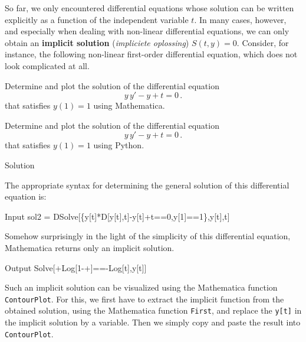 So far, we only encountered differential equations whose solution can be written explicitly as a function of the independent variable $t$. In many cases, however, and especially when dealing with non-linear differential equations, we can only obtain an \textbf{implicit solution} (\textit{impliciete oplossing}) $S(t,y)=0$. Consider, for instance, the following  non-linear first-order differential equation, which does not look complicated at all.  


\begin{example}
\ifmathematica
Determine and plot the solution of the differential equation
$$
y\,y' - y + t = 0\,. 
$$
that satisfies $y(1)=1$ using Mathematica.\fi

\ifpython
Determine and plot the solution of the differential equation
$$
y\,y' - y + t = 0\,. 
$$
that satisfies $y(1)=1$ using Python.
\fi

\pagebreak
{}Solution 

\ifmathematica
The appropriate syntax for determining the general solution of this differential equation is: 
\begin{mdframed}[default,backgroundcolor=gray!40,roundcorner=8pt]
\begin{mmaCell}{Input}
  sol2 = DSolve[\{y[t]*D[y[t],t]-y[t]+t==0,y[1]==1\},y[t],t]
\end{mmaCell}
\end{mdframed}

Somehow surprisingly in the light of the simplicity of this differential equation, Mathematica returns only an implicit solution. 

\begin{mdframed}[default,backgroundcolor=gray!40,roundcorner=8pt]
\begin{mmaCell}{Output}
  Solve[+Log[1-+]==-Log[t],y[t]]
\end{mmaCell}
\end{mdframed}

Such an implicit solution can be visualized using the Mathematica function \lstinline{ContourPlot}. For this, we first have to extract the implicit function from the obtained solution, using the Mathematica function \lstinline{First}, and replace the \lstinline{y[t]} in the implicit solution by a variable. Then we simply copy and paste the result into \lstinline{ContourPlot}.  
\begin{mdframed}[default,backgroundcolor=gray!40,roundcorner=8pt]


\end{mdframed}
\end{example}
